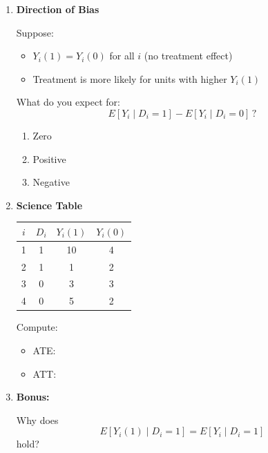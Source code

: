 \documentclass[12pt]{article}
\begin{document}
\begin{enumerate}
Consider:
\[
E[Y_i \mid D_i = 1] - E[Y_i \mid D_i = 0]
\]

Which is correct?

\begin{enumerate}[label=(\alph*)]
    \item Always equals ATE
    \item Always equals ATT
    \item Equals ATT plus selection bias
    \item Equals ATC
\end{enumerate}

\vspace{1cm}

\item \textbf{Direction of Bias}

Suppose:
\begin{itemize}
    \item $Y_i(1) = Y_i(0)$ for all $i$ (no treatment effect)
    \item Treatment is more likely for units with higher $Y_i(1)$
\end{itemize}

What do you expect for:
\[
E[Y_i \mid D_i = 1] - E[Y_i \mid D_i = 0] \, ?
\]

\begin{enumerate}[label=(\alph*)]
    \item Zero
    \item Positive
    \item Negative
\end{enumerate}

\vspace{1cm}

\item \textbf{Science Table}

\begin{center}
\begin{tabular}{c c c c}
$i$ & $D_i$ & $Y_i(1)$ & $Y_i(0)$ \\
\hline
1 & 1 & 10 & 4 \\
2 & 1 & 1 & 2 \\
3 & 0 & 3 & 3 \\
4 & 0 & 5 & 2 \\
\end{tabular}
\end{center}

Compute:

\begin{itemize}
    \item ATE:
    \vspace{0.5cm}
    \item ATT:
    \vspace{0.5cm}
\end{itemize}


\vspace{1cm}

\item \textbf{Bonus:}

Why does
\[
E[Y_i(1)\mid D_i = 1] = E[Y_i \mid D_i = 1]
\]
hold?

\vspace{1cm}

\end{enumerate}
\end{document}
